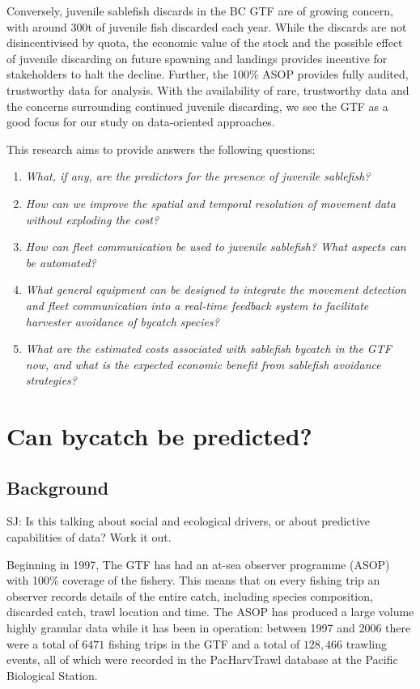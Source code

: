 \documentclass{article}
\newcommand{\sj}[1]{{\color{red}\mbox{}\marginpar{\raggedleft\hspace{0pt}*} SJ: #1}}
\begin{document}
Conversely, juvenile sablefish discards in the BC GTF are of growing concern, with around 300t of juvenile fish discarded each year. While the discards are not disincentivised by quota, the economic value of the stock and the possible effect of juvenile discarding on future spawning and landings provides incentive for stakeholders to halt the decline. Further, the 100\% ASOP provides fully audited, trustworthy data for analysis. With the availability of rare, trustworthy data and the concerns surrounding continued juvenile discarding, we see the GTF as a good focus for our study on data-oriented approaches.

This research aims to provide answers the following questions:
\begin{enumerate}
  \item {\it What, if any, are the predictors for the presence of juvenile sablefish?} \label{Q:predictors}
  \item {\it How can we improve the spatial and temporal resolution of movement data without exploding the cost?}
  \item {\it How can fleet communication be used to juvenile sablefish? What aspects can be automated?}
  \item {\it What general equipment can be designed to integrate the movement detection and fleet communication into a real-time feedback system to facilitate harvester avoidance of bycatch species?}
  \item {\it What are the estimated costs associated with sablefish bycatch in the GTF now, and what is the expected economic benefit from sablefish avoidance strategies?}
\end{enumerate}


\section{Can bycatch be predicted?}\label{sec:predBycatch}

\subsection{Background}

\sj{Is this talking about social and ecological drivers, or about predictive capabilities of data? Work it out.}

Beginning in 1997, The GTF has had an at-sea observer programme (ASOP) with 100\% coverage of the fishery. This means that on every fishing trip an observer records details of the entire catch, including species composition, discarded catch, trawl location and time. The ASOP has produced a large volume highly granular data while it has been in operation: between 1997 and 2006 there were a total of $6471$ fishing trips in the GTF and a total of $128,466$ trawling events, all of which were recorded in the PacHarvTrawl database at the Pacific Biological Station.
\end{document}
